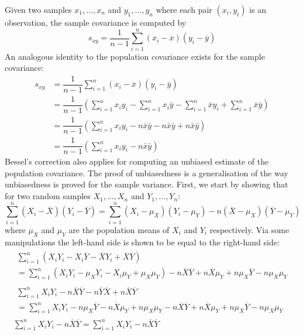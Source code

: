 \documentclass[11pt]{report} %
\begin{document}
Given two samples $x_{1}, \dots, x_{n}$ and $y_{1}, \dots, y_{n}$ where each pair $\left(x_{i}, y_{i}\right)$ is an observation, the sample covariance is computed by
\begin{equation}
s_{xy} = \dfrac{1}{n - 1}\sum_{i = 1}^{n}\left(x_{i} - \overline{x}\right)\left(y_{i} - \overline{y}\right)
\end{equation}
An analogous identity to the population covariance exists for the sample covariance:
\begin{align}
s_{xy} &= \dfrac{1}{n - 1}\sum_{i = 1}^{n}\left(x_{i} - \overline{x}\right)\left(y_{i} - \overline{y}\right) \\
&= \dfrac{1}{n-1}\left(\sum_{i=1}^{n}x_{i}y_{i}-\sum_{i=1}^{n}x_{i}\bar{y}-\sum_{i=1}^{n}\bar{x}y_{i}+\sum_{i=1}^{n}\bar{x}\bar{y}\right) \\
&= \dfrac{1}{n-1}\left(\sum_{i=1}^{n}x_{i}y_{i}-n\bar{x}\bar{y}-n\bar{x}\bar{y}+n\bar{x}\bar{y}\right) \\
&= \dfrac{1}{n-1}\left(\sum_{i=1}^{n}x_{i}y_{i}-n\bar{x}\bar{y}\right)
\end{align}
Bessel's correction also applies for computing an unbiased estimate of the population covariance. The proof of unbiasedness is a generalisation of the way unbiasedness is proved for the sample variance. First, we start by showing that for two random samples $X_{1}, \dots, X_{n}$ and $Y_{1}, \dots, Y_{n}$:
\begin{equation}
\sum_{i=1}^{n}\left(X_{i}-\overline{X}\right)\left(Y_{i}-\overline{Y}\right)=\sum_{i=1}^{n}\left(X_{i}-\mu_{X}\right)\left(Y_{i}-\mu_{Y}\right)-n\left(\overline{X}-\mu_{X}\right)\left(\overline{Y}-\mu_{Y}\right)
\end{equation}
where $\mu_{X}$ and $\mu_{Y}$ are the population means of $X_{i}$ and $Y_{i}$ respectively. Via some manipulations the left-hand side is shown to be equal to the right-hand side:
\begin{gather}
\begin{multlined}
\sum_{i=1}^{n}\left(X_{i}Y_{i}-X_{i}\overline{Y}-\overline{X}Y_{i}+\overline{X}\overline{Y}\right) \\
=\sum_{i=1}^{n}\left(X_{i}Y_{i}-\mu_{X}Y_{i}-X_{i}\mu_{Y}+\mu_{X}\mu_{Y}\right)-n\overline{X}\overline{Y}+n\overline{X}\mu_{Y}+n\mu_{X}\overline{Y}-n\mu_{X}\mu_{Y}
\end{multlined} \\
\begin{multlined}
\sum_{i=1}^{n}X_{i}Y_{i}-n\overline{X}\overline{Y}-n\overline{Y}\overline{X}+n\overline{X}\overline{Y} \\
=\sum_{i=1}^{n}X_{i}Y_{i}-n\mu_{X}\overline{Y}-n\overline{X}\mu_{Y}+n\mu_{X}\mu_{Y}-n\overline{X}\overline{Y}+n\overline{X}\mu_{Y}+n\mu_{X}\overline{Y}-n\mu_{X}\mu_{Y}
\end{multlined} \\
\sum_{i=1}^{n}X_{i}Y_{i}-n\overline{X}\overline{Y}=\sum_{i=1}^{n}X_{i}Y_{i}-n\overline{X}\overline{Y}
\end{gather}
\end{document}
